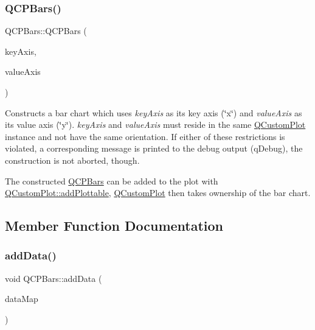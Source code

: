 \subsubsection{\texorpdfstring{Q\+C\+P\+Bars()}{QCPBars()}}
{\footnotesize\ttfamily Q\+C\+P\+Bars\+::\+Q\+C\+P\+Bars (\begin{DoxyParamCaption}\item[{\mbox{\hyperlink{class_q_c_p_axis}{Q\+C\+P\+Axis}} $\ast$}]{key\+Axis,  }\item[{\mbox{\hyperlink{class_q_c_p_axis}{Q\+C\+P\+Axis}} $\ast$}]{value\+Axis }\end{DoxyParamCaption})\hspace{0.3cm}{\ttfamily [explicit]}}

Constructs a bar chart which uses {\itshape key\+Axis} as its key axis (\char`\"{}x\char`\"{}) and {\itshape value\+Axis} as its value axis (\char`\"{}y\char`\"{}). {\itshape key\+Axis} and {\itshape value\+Axis} must reside in the same \mbox{\hyperlink{class_q_custom_plot}{Q\+Custom\+Plot}} instance and not have the same orientation. If either of these restrictions is violated, a corresponding message is printed to the debug output (q\+Debug), the construction is not aborted, though.

The constructed \mbox{\hyperlink{class_q_c_p_bars}{Q\+C\+P\+Bars}} can be added to the plot with \mbox{\hyperlink{class_q_custom_plot_ab7ad9174f701f9c6f64e378df77927a6}{Q\+Custom\+Plot\+::add\+Plottable}}, \mbox{\hyperlink{class_q_custom_plot}{Q\+Custom\+Plot}} then takes ownership of the bar chart. 

\subsection{Member Function Documentation}
\mbox{\label{class_q_c_p_bars_a1f29cf08615040993209147fa68de3f2}} 
\subsubsection{\texorpdfstring{add\+Data()}{addData()}\hspace{0.1cm}{\footnotesize\ttfamily [1/4]}}
{\footnotesize\ttfamily void Q\+C\+P\+Bars\+::add\+Data (\begin{DoxyParamCaption}\item[{const \mbox{\hyperlink{qcustomplot_8h_aa846c77472cae93def9f1609d0c57191}{Q\+C\+P\+Bar\+Data\+Map}} \&}]{data\+Map }\end{DoxyParamCaption})}

